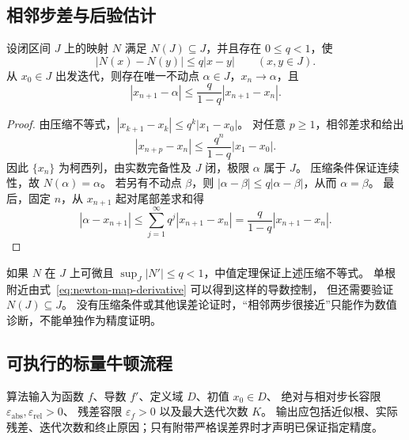\documentclass[UTF8,12pt,a4paper,fontset=fandol]{ctexart}
\begin{document}
\subsection{相邻步差与后验估计}

\begin{proposition}[压缩条件下的步差估计]\label{prop:newton-step}
设闭区间 $J$ 上的映射 $N$ 满足 $N(J)\subseteq J$，并且存在 $0\le q<1$，使
\[
  |N(x)-N(y)|\le q|x-y|\qquad(x,y\in J).
\]
从 $x_0\in J$ 出发迭代，则存在唯一不动点 $\alpha\in J$，$x_n\to\alpha$，且
\begin{equation}\label{eq:newton-step-bound}
  |x_{n+1}-\alpha|\le\frac{q}{1-q}|x_{n+1}-x_n|.
\end{equation}
\end{proposition}

\begin{proof}
由压缩不等式，$|x_{k+1}-x_k|\le q^k|x_1-x_0|$。
对任意 $p\ge1$，相邻差求和给出
\[
  |x_{n+p}-x_n|\le\frac{q^n}{1-q}|x_1-x_0|.
\]
因此 $\{x_n\}$ 为柯西列，由实数完备性及 $J$ 闭，极限 $\alpha$ 属于 $J$。
压缩条件保证连续性，故 $N(\alpha)=\alpha$。
若另有不动点 $\beta$，则 $|\alpha-\beta|\le q|\alpha-\beta|$，从而 $\alpha=\beta$。
最后，固定 $n$，从 $x_{n+1}$ 起对尾部差求和得
\[
  |\alpha-x_{n+1}|\le\sum_{j=1}^{\infty}q^j|x_{n+1}-x_n|
  =\frac{q}{1-q}|x_{n+1}-x_n|.
\]
\end{proof}

如果 $N$ 在 $J$ 上可微且 $\sup_J|N'|\le q<1$，中值定理保证上述压缩不等式。
单根附近由式~\eqref{eq:newton-map-derivative} 可以得到这样的导数控制，
但还需要验证 $N(J)\subseteq J$。
没有压缩条件或其他误差论证时，“相邻两步很接近”只能作为数值诊断，不能单独作为精度证明。

\subsection{可执行的标量牛顿流程}

算法输入为函数 $f$、导数 $f'$、定义域 $D$、初值 $x_0\in D$、
绝对与相对步长容限 $\varepsilon_{\mathrm{abs}},\varepsilon_{\mathrm{rel}}>0$、
残差容限 $\varepsilon_f>0$ 以及最大迭代次数 $K$。
输出应包括近似根、实际残差、迭代次数和终止原因；只有附带严格误差界时才声明已保证指定精度。
\end{document}
